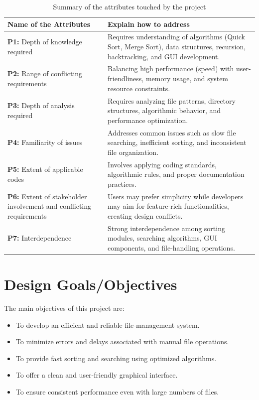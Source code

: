 \documentclass[12pt]{report}
\begin{document}
\begin{table}[htbp]
   \centering
    \caption{Summary of the attributes touched by the project}
    \begin{tabular}{|p{6.0 cm}|p{8 cm}|}
    \toprule
        \textbf{Name of the Attributes} & \textbf{Explain how to address}  \\
        \midrule

    \textbf{P1:} Depth of knowledge required  & Requires understanding of algorithms (Quick Sort, Merge Sort), data structures, recursion, backtracking, and GUI development. \\
      \hline
       
    \textbf{P2:} Range of conflicting requirements  & Balancing high performance (speed) with user-friendliness, memory usage, and system resource constraints. \\
      \hline

    \textbf{P3:} Depth of analysis required  & Requires analyzing file patterns, directory structures, algorithmic behavior, and performance optimization. \\
    \hline
    
    \textbf{P4:} Familiarity of issues  & Addresses common issues such as slow file searching, inefficient sorting, and inconsistent file organization. \\ 
    \hline
    \textbf{P5:} Extent of applicable codes  & Involves applying coding standards, algorithmic rules, and proper documentation practices. \\
      \hline
       
    \textbf{P6:} Extent of stakeholder involvement and conflicting requirements  & Users may prefer simplicity while developers may aim for feature-rich functionalities, creating design conflicts. \\
      \hline

    \textbf{P7:} Interdependence  & Strong interdependence among sorting modules, searching algorithms, GUI components, and file-handling operations. \\
    \hline
        
    \end{tabular}
    \label{tab:CEP}
\end{table}

\section{Design Goals/Objectives}
The main objectives of this project are:
\begin{itemize}
    \item To develop an efficient and reliable file-management system.
    \item To minimize errors and delays associated with manual file operations.
    \item To provide fast sorting and searching using optimized algorithms.
    \item To offer a clean and user-friendly graphical interface.
    \item To ensure consistent performance even with large numbers of files.
\end{itemize}
\end{document}
